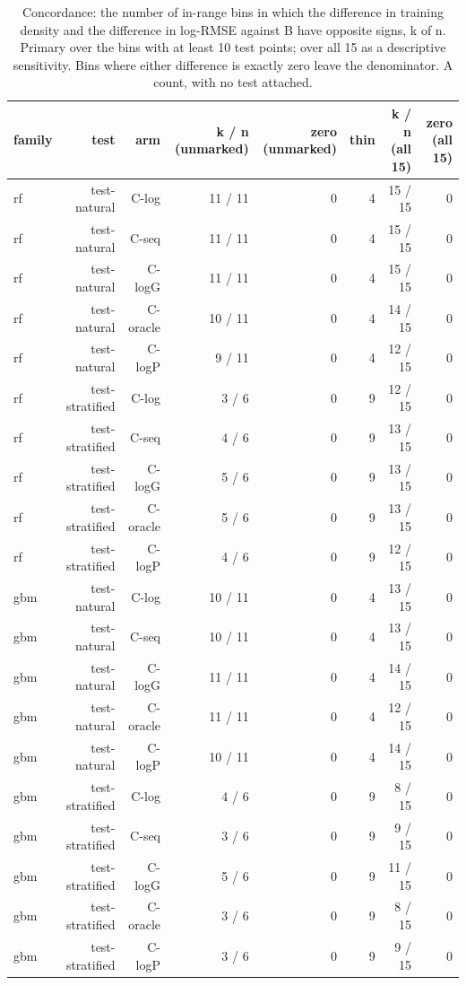 \begin{table}[htbp]
\centering
\small
\setlength{\tabcolsep}{4pt}
\caption{Concordance: the number of in-range bins in which the difference in training density and the difference in log-RMSE against B have opposite signs, k of n. Primary over the bins with at least 10 test points; over all 15 as a descriptive sensitivity. Bins where either difference is exactly zero leave the denominator. A count, with no test attached.}
\label{tab:structural:concordance}
\begin{tabular}{lrrrrrrr}
\toprule
family & test & arm & k / n (unmarked) & zero (unmarked) & thin & k / n (all 15) & zero (all 15) \\
\midrule
rf & test-natural & C-log & 11 / 11 & 0 & 4 & 15 / 15 & 0 \\
rf & test-natural & C-seq & 11 / 11 & 0 & 4 & 15 / 15 & 0 \\
rf & test-natural & C-logG & 11 / 11 & 0 & 4 & 15 / 15 & 0 \\
rf & test-natural & C-oracle & 10 / 11 & 0 & 4 & 14 / 15 & 0 \\
rf & test-natural & C-logP & 9 / 11 & 0 & 4 & 12 / 15 & 0 \\
rf & test-stratified & C-log & 3 / 6 & 0 & 9 & 12 / 15 & 0 \\
rf & test-stratified & C-seq & 4 / 6 & 0 & 9 & 13 / 15 & 0 \\
rf & test-stratified & C-logG & 5 / 6 & 0 & 9 & 13 / 15 & 0 \\
rf & test-stratified & C-oracle & 5 / 6 & 0 & 9 & 13 / 15 & 0 \\
rf & test-stratified & C-logP & 4 / 6 & 0 & 9 & 12 / 15 & 0 \\
gbm & test-natural & C-log & 10 / 11 & 0 & 4 & 13 / 15 & 0 \\
gbm & test-natural & C-seq & 10 / 11 & 0 & 4 & 13 / 15 & 0 \\
gbm & test-natural & C-logG & 11 / 11 & 0 & 4 & 14 / 15 & 0 \\
gbm & test-natural & C-oracle & 11 / 11 & 0 & 4 & 12 / 15 & 0 \\
gbm & test-natural & C-logP & 10 / 11 & 0 & 4 & 14 / 15 & 0 \\
gbm & test-stratified & C-log & 4 / 6 & 0 & 9 & 8 / 15 & 0 \\
gbm & test-stratified & C-seq & 3 / 6 & 0 & 9 & 9 / 15 & 0 \\
gbm & test-stratified & C-logG & 5 / 6 & 0 & 9 & 11 / 15 & 0 \\
gbm & test-stratified & C-oracle & 3 / 6 & 0 & 9 & 8 / 15 & 0 \\
gbm & test-stratified & C-logP & 3 / 6 & 0 & 9 & 9 / 15 & 0 \\
\bottomrule
\end{tabular}
\end{table}
